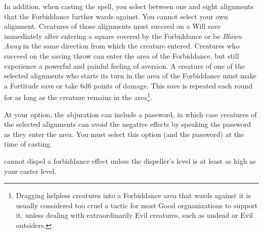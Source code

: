 In addition, when casting the spell, you select between one and eight alignments that the Forbiddance further wards against. You cannot select your own alignment.
Creatures of those alignments must succeed on a Will save immediately after entering a square covered by the Forbiddance or be \emph{Blown Away} in the same direction from which the creature entered.
Creatures who succeed on the saving throw can enter the area of the Forbiddance, but still experience a powerful and painful feeling of aversion.
A creature of one of the selected alignments who starts its turn in the area of the Forbiddance must make a Fortitude save or take 6d6 points of damage. This save is repeated each round for as long as the creature remains in the area\footnote{Dragging helpless creatures into a Forbiddance area that wards against it is usually considered too cruel a tactic for most Good orgnanizations to support it, unless dealing with extraordinarily Evil creatures, such as undead or Evil outsiders.}.
% 

At your option, the abjuration can include a password, in which case creatures of the selected alignments can avoid the negative effects by speaking the password as they enter the area. 
You must select this option (and the password) at the time of casting.

 cannot dispel a forbiddance effect unless the dispeller's level is at least as high as your caster level.

